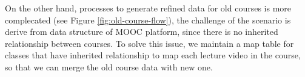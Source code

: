 On the other hand, processes to generate refined data for old courses is more complecated (see Figure \ref{fig:old-course-flow}), the challenge of the scenario is derive from data structure of MOOC platform, since there is no inherited relationship between courses.
To solve this issue, we maintain a map table for classes that have inherited relationship to map each lecture video in the course, so that we can merge the old course data with new one.
